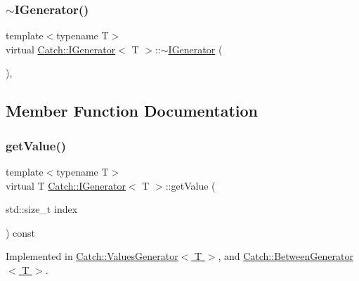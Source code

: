 \subsubsection{\texorpdfstring{$\sim$\+I\+Generator()}{~IGenerator()}}
{\footnotesize\ttfamily template$<$typename T$>$ \\
virtual \hyperlink{struct_catch_1_1_i_generator}{Catch\+::\+I\+Generator}$<$ T $>$\+::$\sim$\hyperlink{struct_catch_1_1_i_generator}{I\+Generator} (\begin{DoxyParamCaption}{ }\end{DoxyParamCaption})\hspace{0.3cm}{\ttfamily [inline]}, {\ttfamily [virtual]}}



\subsection{Member Function Documentation}
\hypertarget{struct_catch_1_1_i_generator_ad69e937cb66dba3ed9429c42abf4fce3}{}\label{struct_catch_1_1_i_generator_ad69e937cb66dba3ed9429c42abf4fce3} 
\subsubsection{\texorpdfstring{get\+Value()}{getValue()}}
{\footnotesize\ttfamily template$<$typename T$>$ \\
virtual T \hyperlink{struct_catch_1_1_i_generator}{Catch\+::\+I\+Generator}$<$ T $>$\+::get\+Value (\begin{DoxyParamCaption}\item[{std\+::size\+\_\+t}]{index }\end{DoxyParamCaption}) const\hspace{0.3cm}{\ttfamily [pure virtual]}}



Implemented in \hyperlink{class_catch_1_1_values_generator_a9674c8b70d562d2d68154de92dd1810a}{Catch\+::\+Values\+Generator$<$ T $>$}, and \hyperlink{class_catch_1_1_between_generator_a913f74bb0c23b3bc0127abfffdabbd94}{Catch\+::\+Between\+Generator$<$ T $>$}.

